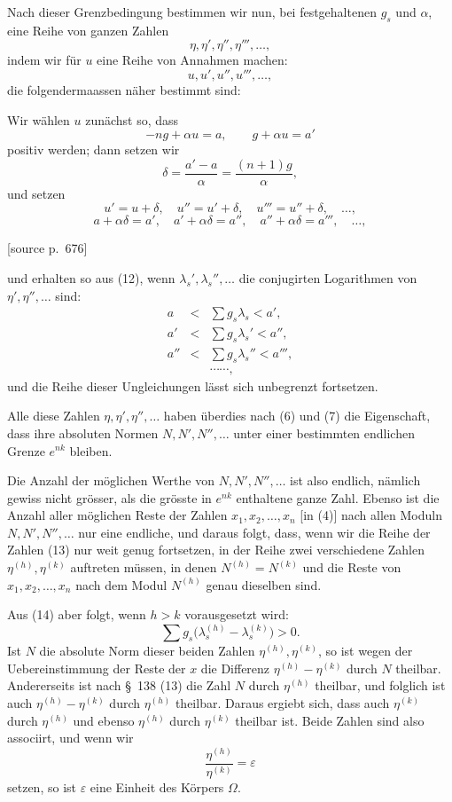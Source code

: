 \documentclass[11pt]{article}
\newcommand{\srcpage}[1]{\par\medskip\noindent\textsf{[source p.~#1]}\par\smallskip}
\begin{document}
Nach dieser Grenzbedingung bestimmen wir nun, bei festgehaltenen $g_s$ und $\alpha$, eine Reihe von ganzen Zahlen
\begin{equation}
\eta,\eta',\eta'',\eta''',\ldots,
\tag{13}
\end{equation}
indem wir für $u$ eine Reihe von Annahmen machen:
\[
u,u',u'',u''',\ldots,
\]
die folgendermaassen näher bestimmt sind:

Wir wählen $u$ zunächst so, dass
\[
-ng+\alpha u=a,
\qquad
 g+\alpha u=a'
\]
positiv werden; dann setzen wir
\[
\delta=\frac{a'-a}{\alpha}=\frac{(n+1)g}{\alpha},
\]
und setzen
\[
u'=u+\delta,
\quad
u''=u'+\delta,
\quad
u'''=u''+\delta,
\quad\ldots,
\]
\[
a+\alpha\delta=a',
\quad a'+\alpha\delta=a'',
\quad a''+\alpha\delta=a''',
\quad\ldots,
\]
\srcpage{676}
und erhalten so aus (12), wenn $\lambda_s',\lambda_s'',\ldots$ die conjugirten Logarithmen von $\eta',\eta'',\ldots$ sind:
\begin{equation}
\begin{array}{rcl}
a&<&\sum g_s\lambda_s<a',\\
a'&<&\sum g_s\lambda_s'<a'',\\
a''&<&\sum g_s\lambda_s''<a''',\\
&&\cdots\cdots,
\end{array}
\tag{14}
\end{equation}
und die Reihe dieser Ungleichungen lässt sich unbegrenzt fortsetzen.

Alle diese Zahlen $\eta,\eta',\eta'',\ldots$ haben überdies nach (6) und (7) die Eigenschaft, dass ihre absoluten Normen $N,N',N'',\ldots$ unter einer bestimmten endlichen Grenze $e^{nk}$ bleiben.

Die Anzahl der möglichen Werthe von $N,N',N'',\ldots$ ist also endlich, nämlich gewiss nicht grösser, als die grösste in $e^{nk}$ enthaltene ganze Zahl. Ebenso ist die Anzahl aller möglichen Reste der Zahlen $x_1,x_2,\ldots,x_n$ [in (4)] nach allen Moduln $N,N',N'',\ldots$ nur eine endliche, und daraus folgt, dass, wenn wir die Reihe der Zahlen (13) nur weit genug fortsetzen, in der Reihe zwei verschiedene Zahlen $\eta^{(h)},\eta^{(k)}$ auftreten müssen, in denen $N^{(h)}=N^{(k)}$ und die Reste von $x_1,x_2,\ldots,x_n$ nach dem Modul $N^{(h)}$ genau dieselben sind.

Aus (14) aber folgt, wenn $h>k$ vorausgesetzt wird:
\begin{equation}
\sum g_s\bigl(\lambda_s^{(h)}-\lambda_s^{(k)}\bigr)>0.
\tag{15}
\end{equation}
Ist $N$ die absolute Norm dieser beiden Zahlen $\eta^{(h)},\eta^{(k)}$, so ist wegen der Uebereinstimmung der Reste der $x$ die Differenz $\eta^{(h)}-\eta^{(k)}$ durch $N$ theilbar. Andererseits ist nach \S~138 (13) die Zahl $N$ durch $\eta^{(h)}$ theilbar, und folglich ist auch $\eta^{(h)}-\eta^{(k)}$ durch $\eta^{(h)}$ theilbar. Daraus ergiebt sich, dass auch $\eta^{(k)}$ durch $\eta^{(h)}$ und ebenso $\eta^{(h)}$ durch $\eta^{(k)}$ theilbar ist. Beide Zahlen sind also associirt, und wenn wir
\[
\frac{\eta^{(h)}}{\eta^{(k)}}=\varepsilon
\]
setzen, so ist $\varepsilon$ eine Einheit des Körpers $\Omega$.
\end{document}
